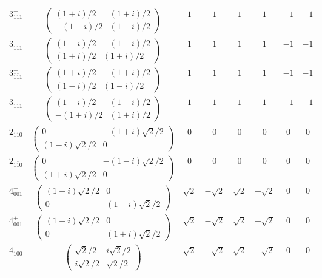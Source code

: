 \documentclass[3p,preprint]{elsarticle}
\begin{document}
\begin{table}[H]
\begin{tabular}{|c|c||c|c|c|c|c|c|}
			$3^{-}_{111}$ &		$\left(\begin{array}{cc} (1+i)/2&(1+i)/2 \\ -(1-i)/2&(1-i)/2 \end{array}\right)$	&$1$ & $1$ & $1$ & $1$ & $-1$ & $-1$ \\ \hline
			$3^{-}_{1\bar{1}\bar{1}}$ &		$\left(\begin{array}{cc} (1-i)/2&-(1-i)/2 \\ (1+i)/2&(1+i)/2 \end{array}\right)$	&$1$ & $1$ & $1$ & $1$ & $-1$ & $-1$ \\ \hline
			$3^{-}_{\bar{1}\bar{1}1}$ &		$\left(\begin{array}{cc} (1+i)/2&-(1+i)/2 \\ (1-i)/2&(1-i)/2 \end{array}\right)$	&$1$ & $1$ & $1$ & $1$ & $-1$ & $-1$ \\ \hline
			$3^{-}_{\bar{1}1\bar{1}}$ &		$\left(\begin{array}{cc} (1-i)/2&(1-i)/2 \\ -(1+i)/2&(1+i)/2 \end{array}\right)$	&$1$ & $1$ & $1$ & $1$ & $-1$ & $-1$ \\ \hline
			$2_{110}$ &		$\left(\begin{array}{cc} 0&-(1+i)\sqrt{2}/2 \\ (1-i)\sqrt{2}/2&0 \end{array}\right)$	&$0$ & $0$ & $0$ & $0$ & $0$ & $0$ \\ \hline
			$2_{1\bar{1}0}$ &		$\left(\begin{array}{cc} 0&-(1-i)\sqrt{2}/2 \\ (1+i)\sqrt{2}/2&0 \end{array}\right)$	&$0$ & $0$ & $0$ & $0$ & $0$ & $0$ \\ \hline
			$4^{-}_{001}$ &		$\left(\begin{array}{cc} (1+i)\sqrt{2}/2&0 \\ 0&(1-i)\sqrt{2}/2 \end{array}\right)$	&$\sqrt{2}$ & $-\sqrt{2}$ & $\sqrt{2}$ & $-\sqrt{2}$ & $0$ & $0$ \\ \hline
			$4^{+}_{001}$ &		$\left(\begin{array}{cc} (1-i)\sqrt{2}/2&0 \\ 0&(1+i)\sqrt{2}/2 \end{array}\right)$	&$\sqrt{2}$ & $-\sqrt{2}$ & $\sqrt{2}$ & $-\sqrt{2}$ & $0$ & $0$ \\ \hline
			$4^{-}_{100}$ &		$\left(\begin{array}{cc} \sqrt{2}/2&i\sqrt{2}/2 \\ i\sqrt{2}/2&\sqrt{2}/2 \end{array}\right)$	&$\sqrt{2}$ & $-\sqrt{2}$ & $\sqrt{2}$ & $-\sqrt{2}$ & $0$ & $0$ \\ \hline

\end{tabular}
\end{table}
\end{document}
